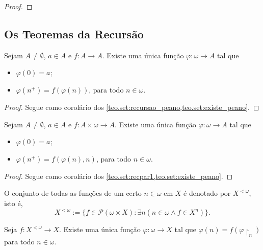 \begin{proof}
    \blackproof
\end{proof}

\subsection{Os Teoremas da Recursão}

\begin{theorem}[Recursão] \label{teo.set:recfin}
    Sejam $A \neq \emptyset$, $a \in A$ e $f:A \to A$. Existe uma única função $\varphi : \omega \to A$ tal que
        \begin{itemize}
            \item $\varphi(0) = a$;
            \item $\varphi(n^+) = f(\varphi(n))$, para todo $n \in \omega$.
        \end{itemize}
\end{theorem}

\begin{proof}
    Segue como corolário dos \cref{teo.set:recursao_peano,teo.set:existe_peano}. \blackproof
\end{proof}

\begin{theorem} \label{teo.set:recpar}
    Sejam $A \neq \emptyset$, $a \in A$ e $f : A \times \omega \to A$. Existe uma única função $\varphi : \omega \to A$ tal que
        \begin{itemize}
            \item $\varphi(0) = a$;
            \item $\varphi(n^+) = f(\varphi(n), n)$, para todo $n \in \omega$.
        \end{itemize}
\end{theorem}

\begin{proof}
    Segue como corolário dos \cref{teo.set:recpar1,teo.set:existe_peano}. \blackproof
\end{proof}

\begin{definition}
    O conjunto de todas as funções de um certo $n \in \omega$ em $X$ é denotado por $X^{< \omega}$, isto é,
        \[
            X^{< \omega} := \{f \in \mathcal{P}(\omega \times X) : \exists n (n \in \omega \land f \in X^n) \}.
        \]
\end{definition}

\begin{theorem} \label{teo.set:reccom}
    Seja $f :  X^{<\omega} \to X$. Existe uma única função $\varphi : \omega \to X$ tal que $\varphi(n) = f(\varphi \restriction_n)$ para todo $n \in \omega$.
\end{theorem}


